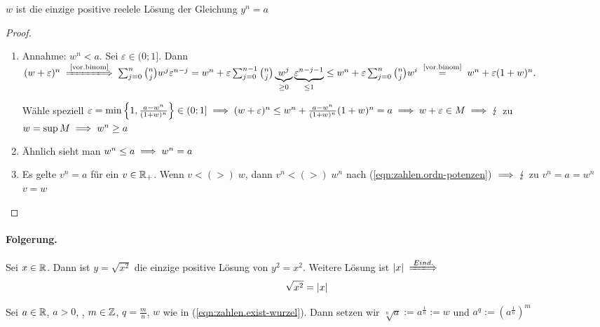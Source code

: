 \documentclass[12pt]{scrreprt}
\begin{document}
\begin{lem}\label{lem:zahlen.wurzel}
$w$ ist die einzige positive reelele Lösung der Gleichung $y^n = a$
\end{lem}
\begin{proof}
\begin{enumerate}
\item Annahme: $w^n<a$. Sei $\varepsilon \in (0;1]$. Dann $(w+\varepsilon)^n \folgtnach{\ref{vor.binom}} \sum^n_{j=0}\binom{n}{j}w^j\varepsilon^{n-j}
= w^n+ \varepsilon \sum^{n-1}_{j=0}\binom{n}{j}\underbrace{w^j}_{\ge 0}\underbrace{\varepsilon^{n-j-1}}_{\le1}
\le w^n + \varepsilon \sum^n_{j=0}\binom{n}{j}w^i \nach{=}{\ref{vor.binom}} w^n + \varepsilon (1+w)^n.$

Wähle speziell $\varepsilon= \min \left\{1,\frac{a-w^n}{(1+w)^n}\right\} \in (0;1] \implies (w+\varepsilon)^n \le w^n +\frac{a-w^n}{(1+w)^n} (1+w)^n=a
\implies w+ \varepsilon \in M \implies \lightning$ zu $w=\sup  M \implies w^n \ge a$
\item Ähnlich sieht man $w^n \le a \implies w^n = a$
\item Es gelte $v^n=a$ für ein $v \in \mathbb{R}_+$. Wenn $v<(>)\;w$, dann $v^n <(>)\;w^n$ nach (\ref{eqn:zahlen.ordn-potenzen}) $\implies \lightning$
zu $v^n = a = w^n$ \folgt $v=w$
\end{enumerate}
\end{proof}

\paragraph{Folgerung.}
Sei $x \in \mathbb{R}$. Dann ist $y = \sqrt{x^2}$ die einzige positive Lösung von $y^2 = x^2$. Weitere Lösung ist $\abs{x} 
\folgtwegen{Eind.}$
\begin{equation}
\sqrt{x^2} = \left\lvert x\right\lvert
\label{eqn:zahlen.betrag-wurzel}
\end{equation}
\begin{dfn}\label{dfn:zahlen.wurzel}
Sei $a \in \mathbb{R}$, $a > 0$, , $m \in \mathbb{Z}$, $q=\frac{m}{n}$, $w$ wie in (\ref{eqn:zahlen.exist-wurzel}).
Dann setzen wir $\sqrt[n]{a} := a^{\frac{1}{n}} := w$ und $a^q:=(a^{\frac{1}{n}})^m$
\end{dfn}
\end{document}
